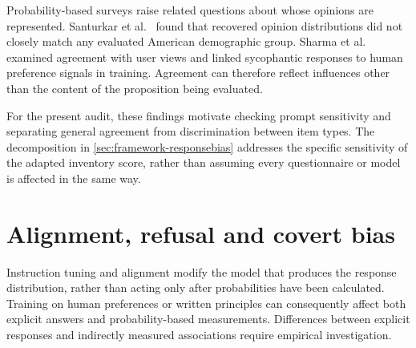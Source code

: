 Probability-based surveys raise related questions about whose opinions are
represented. Santurkar et al.\ \cite{santurkar2023opinions} found that
recovered opinion distributions did not closely match any evaluated American
demographic group. Sharma et al.\ \cite{sharma2024sycophancy} examined
agreement with user views and linked sycophantic responses to human preference
signals in training. Agreement can therefore reflect influences other than
the content of the proposition being evaluated.

For the present audit, these findings motivate checking prompt sensitivity
and separating general agreement from discrimination between item types.
The decomposition in \cref{sec:framework-responsebias} addresses the specific
sensitivity of the adapted inventory score, rather than assuming every
questionnaire or model is affected in the same way.


\section{Alignment, refusal and covert bias}\label{sec:bg-alignment}

Instruction tuning and alignment modify the model that produces the response
distribution, rather than acting only after probabilities have been calculated.
Training on human preferences \cite{ouyang2022training} or written principles
\cite{bai2022constitutional} can consequently affect both explicit answers
and probability-based measurements. Differences between explicit responses
and indirectly measured associations require empirical investigation.

